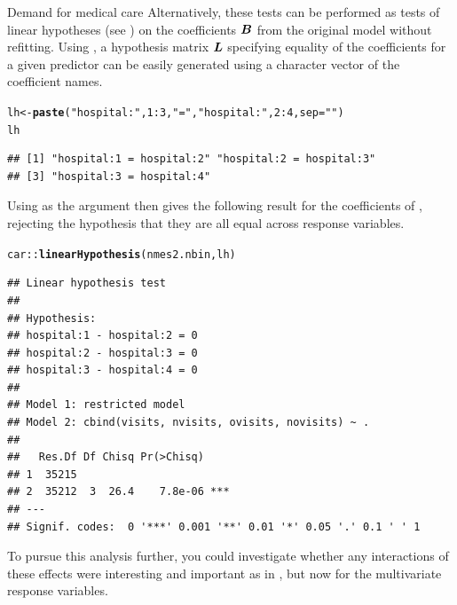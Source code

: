 \documentclass[11pt]{book}\usepackage[]{graphicx}\usepackage[]{color}
\makeatletter
\newcommand{\hlnum}[1]{\textcolor[rgb]{0.686,0.059,0.569}{#1}}%
\newcommand{\hlstr}[1]{\textcolor[rgb]{0.192,0.494,0.8}{#1}}%
\newcommand{\hlopt}[1]{\textcolor[rgb]{0,0,0}{#1}}%
\newcommand{\hlstd}[1]{\textcolor[rgb]{0.345,0.345,0.345}{#1}}%
\newcommand{\hlkwb}[1]{\textcolor[rgb]{0.69,0.353,0.396}{#1}}%
\newcommand{\hlkwc}[1]{\textcolor[rgb]{0.333,0.667,0.333}{#1}}%
\newcommand{\hlkwd}[1]{\textcolor[rgb]{0.737,0.353,0.396}{\textbf{#1}}}%
\newenvironment{kframe}{%
 \def\at@end@of@kframe{}%
 \ifinner\ifhmode%
  \def\at@end@of@kframe{\end{minipage}}%
  \begin{minipage}{\columnwidth}%
 \fi\fi%
 \def\FrameCommand##1{\hskip\@totalleftmargin \hskip-\fboxsep
 \colorbox{shadecolor}{##1}\hskip-\fboxsep
     \hskip-\linewidth \hskip-\@totalleftmargin \hskip\columnwidth}%
 \MakeFramed {\advance\hsize-\width
   \@totalleftmargin\z@ \linewidth\hsize
   \@setminipage}}%
 {\par\unskip\endMakeFramed%
 \at@end@of@kframe}
\newenvironment{knitrout}{}{} %
\renewenvironment{knitrout}{\small\renewcommand{\baselinestretch}{.85}}{} %
\makeatother
\begin{document}
\begin{Example}[nmes5]{Demand for medical care}
Alternatively, these tests can be performed as tests of linear hypotheses (see )
on the coefficients
$\bm{B}$ from the original model without refitting. Using , a hypothesis
matrix $\bm{L}$ specifying equality of the coefficients for a given predictor can be
easily generated using a character vector of the coefficient names.

\begin{knitrout}
\color{fgcolor}\begin{kframe}
\begin{alltt}
\hlstd{lh} \hlkwb{<-} \hlkwd{paste}\hlstd{(}\hlstr{"hospital:"}\hlstd{,} \hlnum{1}\hlopt{:}\hlnum{3}\hlstd{,} \hlstr{" = "}\hlstd{,} \hlstr{"hospital:"}\hlstd{,} \hlnum{2}\hlopt{:}\hlnum{4}\hlstd{,} \hlkwc{sep}\hlstd{=}\hlstr{""}\hlstd{)}
\hlstd{lh}
\end{alltt}
\begin{verbatim}
## [1] "hospital:1 = hospital:2" "hospital:2 = hospital:3"
## [3] "hospital:3 = hospital:4"
\end{verbatim}
\end{kframe}
\end{knitrout}
Using  as the  argument then gives the following result
for the coefficients of , rejecting the hypothesis that they are all equal
across response variables.
\begin{knitrout}
\color{fgcolor}\begin{kframe}
\begin{alltt}
\hlstd{car::}\hlkwd{linearHypothesis}\hlstd{(nmes2.nbin, lh)}
\end{alltt}
\begin{verbatim}
## Linear hypothesis test
## 
## Hypothesis:
## hospital:1 - hospital:2 = 0
## hospital:2 - hospital:3 = 0
## hospital:3 - hospital:4 = 0
## 
## Model 1: restricted model
## Model 2: cbind(visits, nvisits, ovisits, novisits) ~ .
## 
##   Res.Df Df Chisq Pr(>Chisq)    
## 1  35215                        
## 2  35212  3  26.4    7.8e-06 ***
## ---
## Signif. codes:  0 '***' 0.001 '**' 0.01 '*' 0.05 '.' 0.1 ' ' 1
\end{verbatim}
\end{kframe}
\end{knitrout}
\end{Example}

To pursue this analysis further, you could investigate whether any interactions of these
effects were interesting and important as in , but now for the multivariate
response variables.
\end{document}
